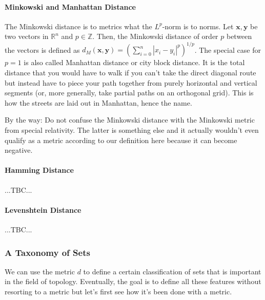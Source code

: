 \paragraph{Minkowski and Manhattan Distance}
The Minkowski distance is to metrics what the $L^p$-norm is to norms. Let $\mathbf{x,y}$ be two vectors in $\mathbb{R}^n$ and $p \in \mathbb{Z}$. Then, the Minkowski distance of order $p$ between the vectors is defined as $d_M(\mathbf{x,y}) = (\sum_{i=0}^n |x_i - y_i|^p )^{1/p}$. The special case for $p=1$ is also called Manhattan distance or city block distance. It is the total distance that you would have to walk if you can't take the direct diagonal route but instead have to piece your path together from purely horizontal and vertical segments (or, more generally, take partial paths on an orthogonal grid). This is how the streets are laid out in Manhattan, hence the name. 

\medskip
By the way: Do not confuse the Minkowski distance with the Minkowski metric from special relativity. The latter is something else and it actually wouldn't even qualify as a metric according to our definition here because it can become negative.



\paragraph{Hamming Distance} ...TBC...

\paragraph{Levenshtein Distance} ...TBC...






\subsubsection{A Taxonomy of Sets}
We can use the metric $d$ to define a certain classification of sets that is important in the field of topology. Eventually, the goal is to define all these features without resorting to a metric but let's first see how it's been done with a metric.

